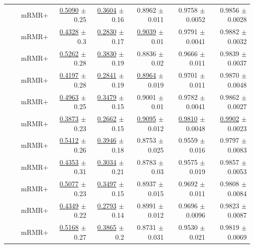 \begin{longtable}{llp{}rrrrr}
 &  & mRMR+ & \underline{0.5090} {\scriptsize $\pm$ 0.25} & \underline{0.3604} {\scriptsize $\pm$ 0.16} & 0.8962 {\scriptsize $\pm$ 0.011} & 0.9758 {\scriptsize $\pm$ 0.0052} & 0.9856 {\scriptsize $\pm$ 0.0028} \\
 &  & mRMR+ & \underline{0.4328} {\scriptsize $\pm$ 0.3} & \underline{0.2830} {\scriptsize $\pm$ 0.17} & \underline{0.9039} {\scriptsize $\pm$ 0.01} & 0.9791 {\scriptsize $\pm$ 0.0041} & 0.9882 {\scriptsize $\pm$ 0.0032} \\
 &  & mRMR+ & \underline{0.5262} {\scriptsize $\pm$ 0.28} & \underline{0.3830} {\scriptsize $\pm$ 0.19} & 0.8836 {\scriptsize $\pm$ 0.02} & 0.9666 {\scriptsize $\pm$ 0.011} & 0.9839 {\scriptsize $\pm$ 0.0037} \\
 &  & mRMR+ & \underline{0.4197} {\scriptsize $\pm$ 0.28} & \underline{0.2841} {\scriptsize $\pm$ 0.19} & \underline{0.8964} {\scriptsize $\pm$ 0.019} & 0.9701 {\scriptsize $\pm$ 0.011} & 0.9870 {\scriptsize $\pm$ 0.0048} \\
 &  & mRMR+ & \underline{0.4963} {\scriptsize $\pm$ 0.25} & \underline{0.3479} {\scriptsize $\pm$ 0.15} & 0.9001 {\scriptsize $\pm$ 0.01} & 0.9782 {\scriptsize $\pm$ 0.0041} & 0.9862 {\scriptsize $\pm$ 0.0027} \\
 &  & mRMR+ & \underline{0.3873} {\scriptsize $\pm$ 0.23} & \underline{0.2662} {\scriptsize $\pm$ 0.15} & \underline{0.9095} {\scriptsize $\pm$ 0.012} & \underline{0.9810} {\scriptsize $\pm$ 0.0048} & \underline{0.9902} {\scriptsize $\pm$ 0.0023} \\
 &  & mRMR+ & \underline{0.5412} {\scriptsize $\pm$ 0.26} & \underline{0.3946} {\scriptsize $\pm$ 0.18} & 0.8753 {\scriptsize $\pm$ 0.025} & 0.9559 {\scriptsize $\pm$ 0.016} & 0.9797 {\scriptsize $\pm$ 0.0083} \\
 &  & mRMR+ & \underline{0.4353} {\scriptsize $\pm$ 0.31} & \underline{0.3034} {\scriptsize $\pm$ 0.21} & 0.8783 {\scriptsize $\pm$ 0.03} & 0.9575 {\scriptsize $\pm$ 0.019} & 0.9857 {\scriptsize $\pm$ 0.0053} \\
 &  & mRMR+ & \underline{0.5077} {\scriptsize $\pm$ 0.23} & \underline{0.3497} {\scriptsize $\pm$ 0.15} & 0.8937 {\scriptsize $\pm$ 0.015} & 0.9692 {\scriptsize $\pm$ 0.011} & 0.9808 {\scriptsize $\pm$ 0.0084} \\
 &  & mRMR+ & \underline{0.4349} {\scriptsize $\pm$ 0.22} & \underline{0.2793} {\scriptsize $\pm$ 0.14} & 0.8991 {\scriptsize $\pm$ 0.012} & 0.9696 {\scriptsize $\pm$ 0.0096} & 0.9823 {\scriptsize $\pm$ 0.0087} \\
 &  & mRMR+ & \underline{0.5168} {\scriptsize $\pm$ 0.27} & \underline{0.3865} {\scriptsize $\pm$ 0.2} & 0.8731 {\scriptsize $\pm$ 0.031} & 0.9530 {\scriptsize $\pm$ 0.021} & 0.9819 {\scriptsize $\pm$ 0.0069} \\

\end{longtable}
